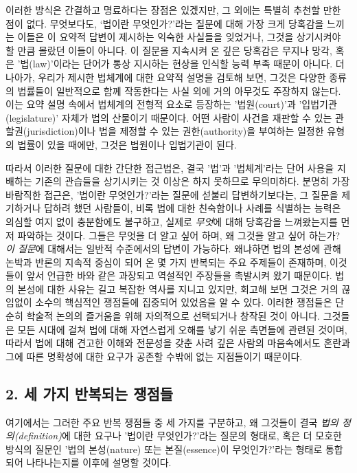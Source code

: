 \documentclass[12pt, oneside]{book}  %
\begin{document}
이러한 방식은 간결하고 명료하다는 장점은 있겠지만, 그 외에는 특별히
추천할 만한 점이 없다. 무엇보다도, `법이란 무엇인가?'라는 질문에 대해
가장 크게 당혹감을 느끼는 이들은 이 요약적 답변이 제시하는 익숙한
사실들을 잊었거나, 그것을 상기시켜야 할 만큼 몰랐던 이들이 아니다. 이
질문을 지속시켜 온 깊은 당혹감은 무지나 망각, 혹은 '법(law)'이라는
단어가 통상 지시하는 현상을 인식할 능력 부족 때문이 아니다. 더 나아가,
우리가 제시한 법체계에 대한 요약적 설명을 검토해 보면, 그것은 다양한
종류의 법률들이 일반적으로 함께 작동한다는 사실 외에 거의 아무것도
주장하지 않는다. 이는 요약 설명 속에서 법체계의 전형적 요소로 등장하는
'법원(court)'과 '입법기관(legislature)' 자체가 법의 산물이기 때문이다.
어떤 사람이 사건을 재판할 수 있는 관할권(jurisdiction)이나 법을 제정할
수 있는 권한(authority)을 부여하는 일정한 유형의 법률이 있을 때에만,
그것은 법원이나 입법기관이 된다.

따라서 이러한 질문에 대한 간단한 접근법은, 결국 '법'과 '법체계'라는 단어
사용을 지배하는 기존의 관습들을 상기시키는 것 이상은 하지 못하므로
무의미하다. 분명히 가장 바람직한 접근은, '법이란 무엇인가?'라는 질문에
섣불리 답변하기보다는, 그 질문을 제기하거나 답하려 했던 사람들이, 비록
법에 대한 친숙함이나 사례를 식별하는 능력은 의심할 여지 없이 충분함에도
불구하고, 실제로 \emph{무엇}에 대해 당혹감을 느껴왔는지를 먼저 파악하는
것이다. 그들은 무엇을 더 알고 싶어 하며, 왜 그것을 알고 싶어 하는가?
\emph{이 질문}에 대해서는 일반적 수준에서의 답변이 가능하다. 왜냐하면
법의 본성에 관해 논박과 반론의 지속적 중심이 되어 온 몇 가지 반복되는
주요 주제들이 존재하며, 이것들이 앞서 언급한 바와 같은 과장되고 역설적인
주장들을 촉발시켜 왔기 때문이다. 법의 본성에 대한 사유는 길고 복잡한
역사를 지니고 있지만, 회고해 보면 그것은 거의 끊임없이 소수의 핵심적인
쟁점들에 집중되어 있었음을 알 수 있다. 이러한 쟁점들은 단순히 학술적
논의의 즐거움을 위해 자의적으로 선택되거나 창작된 것이 아니다. 그것들은
모든 시대에 걸쳐 법에 대해 자연스럽게 오해를 낳기 쉬운 측면들에 관련된
것이며, 따라서 법에 대해 견고한 이해와 전문성을 갖춘 사려 깊은 사람의
마음속에서도 혼란과 그에 따른 명확성에 대한 요구가 공존할 수밖에 없는
지점들이기 때문이다.

\subsection{\texorpdfstring{\textbf{2. 세 가지 반복되는
쟁점들}}{2. 세 가지 반복되는 쟁점들}}\label{uxc138-uxac00uxc9c0-uxbc18uxbcf5uxb418uxb294-uxc7c1uxc810uxb4e4}

여기에서는 그러한 주요 반복 쟁점들 중 세 가지를 구분하고, 왜 그것들이
결국 \emph{법의 정의(definition)}에 대한 요구나 '법이란 무엇인가?'라는
질문의 형태로, 혹은 더 모호한 방식의 질문인 '법의 본성(nature) 또는
본질(essence)이 무엇인가?'라는 형태로 통합되어 나타나는지를 이후에
설명할 것이다.
\end{document}
